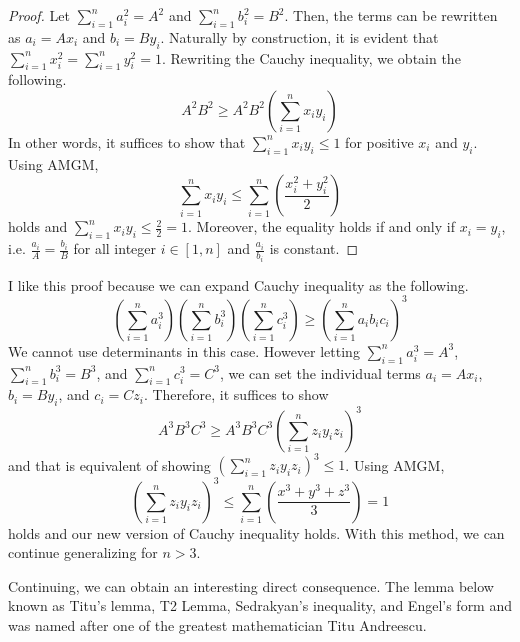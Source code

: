 \documentclass[../../../main.tex]{subfiles}
\begin{document}
\begin{proof}
Let $\sum_{i=1}^n a_i^2 = A^2$ and $\sum_{i=1}^n b_i^2 = B^2$.
Then, the terms can be rewritten as $a_i = A x_i$ and $b_i = B y_i$.
Naturally by construction, it is evident that $\sum_{i=1}^n x_i^2
= \sum_{i=1}^n y_i^2 = 1$. Rewriting the Cauchy inequality,
we obtain the following.
\[
A^2 B^2
\geq A^2 B^2 \left( \sum_{i=1}^n x_i y_i \right)
\]
In other words, it suffices to show that $\sum_{i=1}^n x_i y_i
\leq 1$ for positive $x_i$ and $y_i$. Using AMGM,
\[
\sum_{i=1}^n x_i y_i
\leq \sum_{i=1}^n \left( \frac{x_i^2 + y_i^2}{2} \right)
\]
holds and $\sum_{i=1}^n x_i y_i \leq \frac{2}{2} = 1$. Moreover,
the equality holds if and only if $x_i = y_i$, i.e. $\frac{a_i}{A} =
\frac{b_i}{B}$ for all integer $i \in [1, n]$ and $\frac{a_i}{b_i}$
is constant.
\end{proof}

I like this proof because we can expand Cauchy inequality as
the following.
\[
\left( \sum_{i=1}^n a_i^3 \right) \left( \sum_{i=1}^n b_i^3 \right)
    \left( \sum_{i=1}^n c_i^3 \right)
\geq
\left( \sum_{i=1}^n a_i b_i c_i \right)^3
\]
We cannot use determinants in this case. However letting
$\sum_{i=1}^n a_i^3 = A^3$, $\sum_{i=1}^n b_i^3 = B^3$, and
$\sum_{i=1}^n c_i^3 = C^3$, we can set the individual terms
$a_i = Ax_i$, $b_i = By_i$, and $c_i = Cz_i$. Therefore,
it suffices to show
\[
A^3 B^3 C^3
\geq A^3 B^3 C^3 \left( \sum_{i=1}^n z_i y_i z_i \right)^3
\]
and that is equivalent of showing
$\left( \sum_{i=1}^n z_i y_i z_i \right)^3 \leq 1$. Using AMGM,
\[
\left( \sum_{i=1}^n z_i y_i z_i \right)^3
\leq \sum_{i=1}^n \left( \frac{x^3 + y^3 + z^3}{3} \right)
= 1
\]
holds and our new version of Cauchy inequality holds.
With this method, we can continue generalizing for $n > 3$.

Continuing, we can obtain an interesting direct consequence.
The lemma below known as Titu's lemma, T2 Lemma, Sedrakyan's
inequality, and Engel's form and was named after one of the
greatest mathematician Titu Andreescu.
\end{document}
